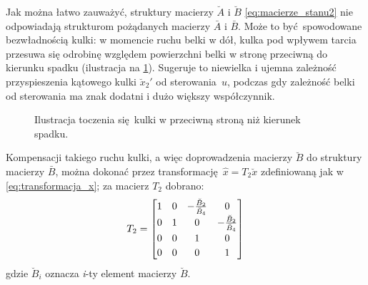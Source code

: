 Jak można łatwo zauważyć, struktury macierzy $\breve{A}$ i $\breve{B}$ \eqref{eq:macierze_stanu2} nie odpowiadają strukturom pożądanych macierzy $\bar{A}$ i $\bar{B}$. Może to być spowodowane bezwładnością kulki: w momencie ruchu belki w dół, kulka pod wpływem tarcia przesuwa się odrobinę względem powierzchni belki w stronę przeciwną do kierunku spadku (ilustracja na \cref{fig:przeciwny_ruch_kulki}). Sugeruje to niewielka i ujemna zależność przyspieszenia kątowego kulki $\breve{x}_2'$ od sterowania~$u$, podczas gdy zależność belki od sterowania ma znak dodatni i dużo większy współczynnik.

\begin{figure}[h]
    \centering
    
    \caption{Ilustracja toczenia się kulki w przeciwną stroną niż kierunek spadku.}
    \label{fig:przeciwny_ruch_kulki}
\end{figure}

Kompensacji takiego ruchu kulki, a więc doprowadzenia macierzy $\breve{B}$ do struktury macierzy $\bar{B}$, można dokonać przez transformację $\hat{x} = T_2 \breve{x}$ zdefiniowaną jak w \eqref{eq:transformacja_x}; za macierz $T_2$ dobrano:
\begin{equation}\label{eq:transformacja2_x}
    \renewcommand\arraystretch{1.2}
    T_2 = \begin{bmatrix}
        1 & 0 & -\frac{\breve{B}_2}{\breve{B}_4} & 0 \\
        0 & 1 & 0 & -\frac{\breve{B}_2}{\breve{B}_4} \\
        0 & 0 & 1 & 0 \\
        0 & 0 & 0 & 1 \\
    \end{bmatrix}
\end{equation}
gdzie $\breve{B}_i$ oznacza \textit{i}-ty element macierzy $\breve{B}$.

